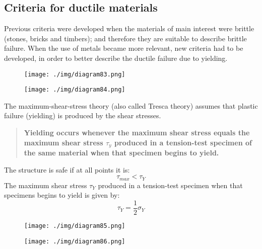 \subsection{Criteria for ductile materials}
Previous criteria were developed when the materials of main interest were brittle (stones, bricks and timbers); and therefore they are suitable to describe brittle failure. When the use of metals became more relevant, new criteria had to be developed, in order to better describe the ductile failure due to yielding.
\begin{figure}
  \begin{center}
    \begin{minipage}[b]{0.46\textwidth}
      \centering
      \texttt{[image: ./img/diagram83.png]}
      \caption{}
    \end{minipage}
    \begin{minipage}[b]{0.46\textwidth}
      \centering
      \texttt{[image: ./img/diagram84.png]}
      \caption{}
    \end{minipage}
  \end{center}
\end{figure}
The maximum-shear-stress theory (also called Tresca theory) assumes that plastic failure (yielding) is produced by the shear stresses.
\begin{quotation}
  \textbf{Yielding occurs whenever the maximum shear stress equals the maximum shear stress $\tau_y$ produced in a tension-test specimen of the same material when that specimen begins to yield.}
\end{quotation}
The structure is safe if at all points it is:
\begin{equation}
  \tau_{max} < \tau_Y
\end{equation}
The maximum shear stress $\tau_Y$ produced in a tension-test specimen when that specimens begins to yield is given by:
\begin{equation}
  \tau_Y = \frac{1}{2}\sigma_Y
\end{equation}
\begin{figure}
  \begin{center}
    \begin{minipage}[b]{0.46\textwidth}
      \centering
      \texttt{[image: ./img/diagram85.png]}
      \caption{}
    \end{minipage}
    \begin{minipage}[b]{0.46\textwidth}
      \centering
      \texttt{[image: ./img/diagram86.png]}
      \caption{}
    \end{minipage}
  \end{center}
\end{figure}
